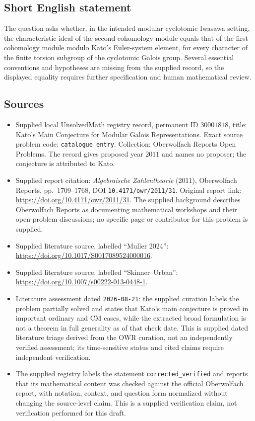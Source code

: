 \documentclass[11pt]{article}
\begin{document}
\subsection{Short English statement}
The question asks whether, in the intended modular cyclotomic Iwasawa setting, the characteristic ideal of the second cohomology module equals that of the first cohomology module modulo Kato's Euler-system element, for every character of the finite torsion subgroup of the cyclotomic Galois group. Several essential conventions and hypotheses are missing from the supplied record, so the displayed equality requires further specification and human mathematical review.
\subsection{Sources}
\begin{itemize}
\item Supplied local UnsolvedMath registry record, permanent ID \(30001818\), title: Kato's Main Conjecture for Modular Galois Representations. Exact source problem code: \texttt{catalogue entry}. Collection: Oberwolfach Reports Open Problems. The record gives proposed year \(2011\) and names no proposer; the conjecture is attributed to Kato.
\item Supplied report citation: \emph{Algebraische Zahlentheorie} (2011), Oberwolfach Reports, pp.\ 1709--1768, DOI \texttt{10.4171/owr/2011/31}. Original report link: \url{https://doi.org/10.4171/owr/2011/31}. The supplied background describes Oberwolfach Reports as documenting mathematical workshops and their open-problem discussions; no specific page or contributor for this problem is supplied.
\item Supplied literature source, labelled ``Muller 2024'': \url{https://doi.org/10.1017/S0017089524000016}.
\item Supplied literature source, labelled ``Skinner--Urban'': \url{https://doi.org/10.1007/s00222-013-0448-1}.
\item Literature assessment dated \texttt{2026-08-21}: the supplied curation labels the problem partially solved and states that Kato's main conjecture is proved in important ordinary and CM cases, while the extracted broad formulation is not a theorem in full generality as of that check date. This is supplied dated literature triage derived from the OWR curation, not an independently verified assessment; its time-sensitive status and cited claims require independent verification.
\item The supplied registry labels the statement \texttt{corrected\_verified} and reports that its mathematical content was checked against the official Oberwolfach report, with notation, context, and question form normalized without changing the source-level claim. This is a supplied verification claim, not verification performed for this draft.
\end{itemize}
\end{document}
